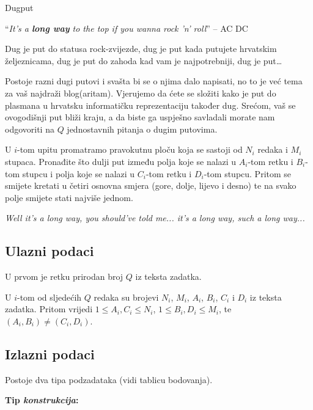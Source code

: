 \begin{statement}[
  problempoints=100,
  timelimit=1 sekunda,
  memorylimit=512 MiB,
]{Dugput}

``\textit{It's a \textbf{long way} to the top if you wanna rock 'n' roll}'' -- AC \text{\Lightning} DC

Dug je put do statusa rock-zvijezde, dug je put kada putujete hrvatskim
željeznicama, dug je put do zahoda kad vam je najpotrebniji, dug je put\ldots

Postoje razni dugi putovi i svašta bi se o njima dalo napisati, no to je već
tema za vaš najdraži blog(aritam). Vjerujemo da ćete se složiti kako je put do
plasmana u hrvatsku informatičku reprezentaciju također dug. Srećom, vaš se
ovogodišnji put bliži kraju, a da biste ga uspješno savladali morate nam
odgovoriti na $Q$ jednostavnih pitanja o dugim putovima.

U $i$-tom upitu promatramo pravokutnu ploču koja se sastoji od $N_i$ redaka i
$M_i$ stupaca.  Pronađite što dulji put između polja koje se nalazi u
$A_i$-tom retku i $B_i$-tom stupcu i polja koje se nalazi u $C_i$-tom retku i
$D_i$-tom stupcu. Pritom se smijete kretati u četiri osnovna smjera (gore,
dolje, lijevo i desno) te na svako polje smijete stati najviše jednom.

\text{\twonotes} \textit{Well it's a long way, you should've told me... it's a long way, such a long way...}
\text{\eighthnote} \text{\twonotes}
\subsection*{Ulazni podaci}
U prvom je retku prirodan broj $Q$ iz teksta zadatka.

U $i$-tom od sljedećih $Q$ redaka su brojevi $N_i$, $M_i$, $A_i$, $B_i$, $C_i$ i 
$D_i$ iz teksta zadatka. Pritom vrijedi $1 \leq A_i, C_i \leq N_i$, $1 \leq B_i, D_i \leq M_i$, te $(A_i, B_i) \neq (C_i, D_i)$.

\subsection*{Izlazni podaci}

Postoje dva tipa podzadataka (vidi tablicu bodovanja).

\textbf{Tip \textit{konstrukcija}:}


\end{statement}

